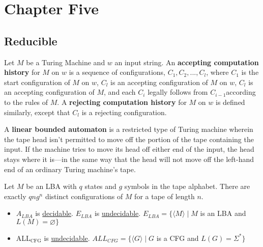 \documentclass[12pt]{article}
\begin{document}
\section{Chapter Five}
\label{sec:orgdedf500}
\subsection{Reducible}
\label{sec:org7620c09}
\begin{definition}
  Let $M$  be a Turing  Machine and $w$  an input string.  An \textbf{accepting
    computation history} for $M$ on $w$  is a sequence of configurations, $C_1,
    C_2, ..., C_l$, where $C_1$ is the start configuration of $M$ on $w$, $C_l$
    is  an  accepting configuration  of  $M$  on  $w$,  $C_l$ is  an  accepting
    configuration  of $M$,  and  each $C_i$  legally follows  from  $C_{i -  1}
    $according to  the rules of  $M$. A \textbf{rejecting  computation history}
    for  $M$ on  $w$ is  defined similarly,  except that  $C_l$ is  a rejecting
    configuration.

\end{definition}

\begin{definition}
  A \textbf{linear  bounded automaton}  is a restricted  type of  Turing machine
  wherein the  tape head  isn't permitted to  move off the  portion of  the tape
  containing the input. If the machine tries  to move its head off either end of
  the input, the head stays where it is---in the same way that the head will not
  move off the left-hand end of an ordinary Turing machine's tape.
\end{definition}

\begin{lemma}
  Let $M$ be an LBA with $q$ states  and $g$ symbols in the tape alphabet. There
  are exactly $qng^n$  distinct configurations of $M$ for a  tape of length $n$.
  \end{lemma} 

\begin{itemize}
\item \(A_{LBA}\) is  \uline{decidable}. \(E_{LBA}\) is  \uline{undecidable}. \(E_{LBA} = \{  \langle M
   \rangle \mid M\) is an LBA and \(L(M) = \varnothing \}\)

\item ALL\(_{\text{CFG}}\) is \uline{undecidable}. \(ALL_{CFG} = \{ \langle G \rangle \mid G\) is a CFG
and \(L(G) = \Sigma^* \}\)
\end{itemize}
\end{document}
